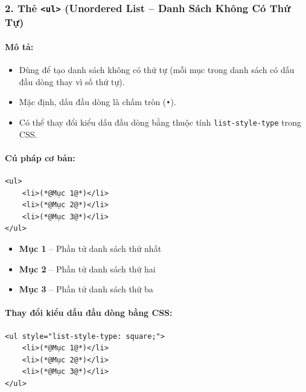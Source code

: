 \documentclass[11pt,oneside]{book}
\newcommand{\codeinline}[1]{\textcolor{accentOrange}{\texttt{#1}}}
\begin{document}
\subsubsection{2. Thẻ \codeinline{<ul>} (Unordered List -- Danh Sách Không Có Thứ Tự)}

\paragraph{Mô tả:}
\begin{itemize}[leftmargin=1.8em, itemsep=3pt, parsep=0pt]
    \item Dùng để tạo danh sách không có thứ tự (mỗi mục trong danh sách có dấu đầu dòng thay vì số thứ tự).
    \item Mặc định, dấu đầu dòng là chấm tròn (\codeinline{•}).
    \item Có thể thay đổi kiểu dấu đầu dòng bằng thuộc tính \codeinline{list-style-type} trong CSS.
\end{itemize}

\paragraph{Cú pháp cơ bản:}
\begin{codeWindow}
\begin{lstlisting}[language=HTML5]
<ul>
    <li>(*@Mục 1@*)</li>
    <li>(*@Mục 2@*)</li>
    <li>(*@Mục 3@*)</li>
</ul>
\end{lstlisting}
\end{codeWindow}

\begin{browserWindow}
\begin{itemize}[leftmargin=1.5em, itemsep=3pt, parsep=0pt]
    \item \textbf{Mục 1} -- Phần tử danh sách thứ nhất
    \item \textbf{Mục 2} -- Phần tử danh sách thứ hai
    \item \textbf{Mục 3} -- Phần tử danh sách thứ ba
\end{itemize}
\end{browserWindow}

\paragraph{Thay đổi kiểu dấu đầu dòng bằng CSS:}
\begin{codeWindow}
\begin{lstlisting}[language=HTML5]
<ul style="list-style-type: square;">
    <li>(*@Mục 1@*)</li>
    <li>(*@Mục 2@*)</li>
    <li>(*@Mục 3@*)</li>
</ul>
\end{lstlisting}
\end{codeWindow}
\end{document}
